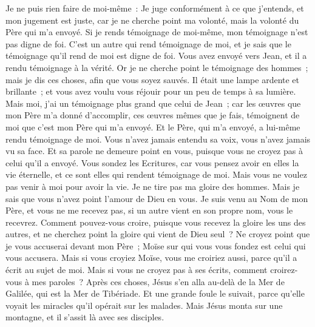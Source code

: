\begin{multicols}{2}
Je ne puis rien faire de moi-même~: Je juge conformément à ce que j'entends, et mon jugement est juste, car je ne cherche point ma volonté, mais la volonté du Père qui m'a envoyé.
Si je rends témoignage de moi-même, mon témoignage n'est pas digne de foi.
C'est un autre qui rend témoignage de moi, et je sais que le témoignage qu'il rend de moi est digne de foi.
Vous avez envoyé vers Jean, et il a rendu témoignage à la vérité.
Or je ne cherche point le témoignage des hommes~; mais je dis ces choses, afin que vous soyez sauvés.
Il était une lampe ardente et brillante~; et vous avez voulu vous réjouir pour un peu de temps à sa lumière.
Mais moi, j'ai un témoignage plus grand que celui de Jean~; car les œuvres que mon Père m'a donné d'accomplir, ces œuvres mêmes que je fais, témoignent de moi que c'est mon Père qui m'a envoyé.
Et le Père, qui m'a envoyé, a lui-même rendu témoignage de moi. Vous n'avez jamais entendu sa voix, vous n'avez jamais vu sa face.
Et sa parole ne demeure point en vous, puisque vous ne croyez pas à celui qu'il a envoyé.
Vous sondez les Ecritures, car vous pensez avoir en elles la vie éternelle, et ce sont elles qui rendent témoignage de moi.
Mais vous ne voulez pas venir à moi pour avoir la vie.
Je ne tire pas ma gloire des hommes.
Mais je sais que vous n'avez point l'amour de Dieu en vous.
Je suis venu au Nom de mon Père, et vous ne me recevez pas, si un autre vient en son propre nom, vous le recevrez.
Comment pouvez-vous croire, puisque vous recevez la gloire les uns des autres, et ne cherchez point la gloire qui vient de Dieu seul~?
Ne croyez point que je vous accuserai devant mon Père~; Moïse sur qui vous vous fondez est celui qui vous accusera.
Mais si vous croyiez Moïse, vous me croiriez aussi, parce qu'il a écrit au sujet de moi.
Mais si vous ne croyez pas à ses écrits, comment croirez-vous à mes paroles~?
\VerseOne{}Après ces choses, Jésus s'en alla au-delà de la Mer de Galilée, qui est la Mer de Tibériade.
Et une grande foule le suivait, parce qu'elle voyait les miracles qu'il opérait sur les malades.
Mais Jésus monta sur une montagne, et il s'assit là avec ses disciples.

\end{multicols}
